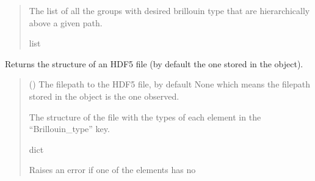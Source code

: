 \documentclass[letterpaper,10pt,english]{sphinxmanual}
\begin{document}
\begin{fulllineitems}
\begin{fulllineitems}
\begin{quote}
\begin{description}
\begin{itemize}
\end{itemize}

\sphinxAtStartPar
The list of all the groups with desired brillouin type that are hierarchically above a given path.

\sphinxAtStartPar
list

\end{description}\end{quote}

\end{fulllineitems}


\begin{fulllineitems}
\label{\detokenize{source/_autosummary/HDF5_BLS.Wrapper:HDF5_BLS.Wrapper.get_structure}}
\pysigstartsignatures
\pysiglinewithargsret
{}
{}
{}
\pysigstopsignatures
\sphinxAtStartPar
Returns the structure of an HDF5 file (by default the one stored in the object).
\begin{quote}\begin{description}
\sphinxAtStartPar
{} (\sphinxstyleliteralemphasis{\sphinxupquote{, }}) \textendash{} The filepath to the HDF5 file, by default None which means the filepath stored in the object is the one observed.

\sphinxAtStartPar
The structure of the file with the types of each element in the “Brillouin\_type” key.

\sphinxAtStartPar
dict

\sphinxAtStartPar
{\hyperref[\detokenize{source/_autosummary/HDF5_BLS.errors:HDF5_BLS.errors.WrapperError_StructureError}]{}} \textendash{} Raises an error if one of the elements has no

\end{description}\end{quote}

\end{fulllineitems}


\end{fulllineitems}
\end{document}

